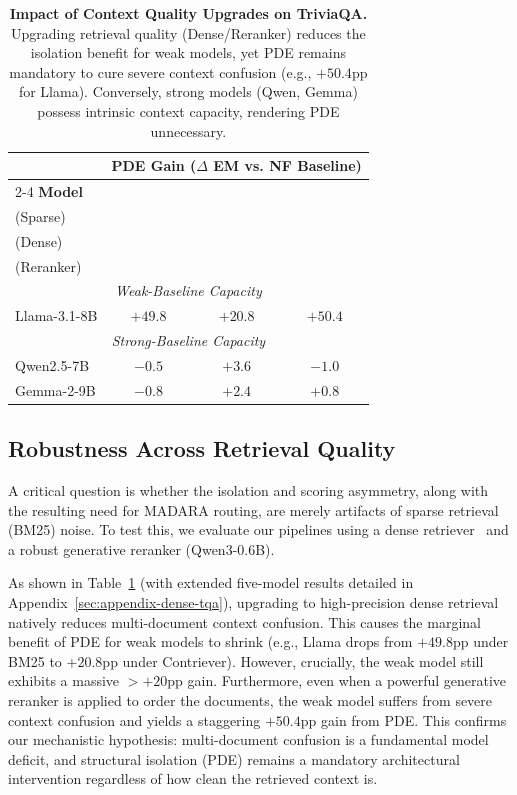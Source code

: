 \documentclass[11pt]{article}
\theoremstyle{definition}
\begin{document}
\begin{table}[ht]
\centering
\small
\begin{tabular}{@{}l ccc@{}}
\toprule
& \multicolumn{3}{c}{\textbf{PDE Gain (\(\Delta\) EM vs. NF Baseline)}} \\
\cmidrule(l){2-4}
\textbf{Model} & \shortstack{\textbf{BM25} \\ \scriptsize{(Sparse)}} & \shortstack{\textbf{Contriever} \\ \scriptsize{(Dense)}} & \shortstack{\textbf{Qwen3-0.6B} \\ \scriptsize{(Reranker)}} \\
\midrule
\multicolumn{4}{c}{\textit{Weak-Baseline Capacity}} \\
Llama-3.1-8B    & \(+49.8\) & \(+20.8\) & \(+50.4\) \\
\midrule
\multicolumn{4}{c}{\textit{Strong-Baseline Capacity}} \\
Qwen2.5-7B      & \(-0.5\)  & \(+3.6\)  & \(-1.0\) \\
Gemma-2-9B      & \(-0.8\)  & \(+2.4\)  & \(+0.8\) \\
\bottomrule
\end{tabular}
\caption{\textbf{Impact of Context Quality Upgrades on TriviaQA.} Upgrading retrieval quality (Dense/Reranker) reduces the isolation benefit for weak models, yet PDE remains mandatory to cure severe context confusion (e.g., \(+50.4\text{pp}\) for Llama). Conversely, strong models (Qwen, Gemma) possess intrinsic context capacity, rendering PDE unnecessary.}
\label{tab:context-generalization}
\end{table}

\subsection{Robustness Across Retrieval Quality}
\label{sec:retrieval-robustness}

A critical question is whether the isolation and scoring asymmetry, along with the resulting need for MADARA routing, are merely artifacts of sparse retrieval (BM25) noise. To test this, we evaluate our pipelines using a dense retriever~\cite{izacard2021unsupervised} and a robust generative reranker (Qwen3-0.6B). 

As shown in Table~\ref{tab:context-generalization} (with extended five-model results detailed in Appendix~\ref{sec:appendix-dense-tqa}), upgrading to high-precision dense retrieval natively reduces multi-document context confusion. This causes the marginal benefit of PDE for weak models to shrink (e.g., Llama drops from \(+49.8\)pp under BM25 to \(+20.8\)pp under Contriever). However, crucially, the weak model still exhibits a massive \(>\)\(+20\)pp gain. Furthermore, even when a powerful generative reranker is applied to order the documents, the weak model suffers from severe context confusion and yields a staggering \(+50.4\)pp gain from PDE. This confirms our mechanistic hypothesis: multi-document confusion is a fundamental model deficit, and structural isolation (PDE) remains a mandatory architectural intervention regardless of how clean the retrieved context is. 
\end{document}
